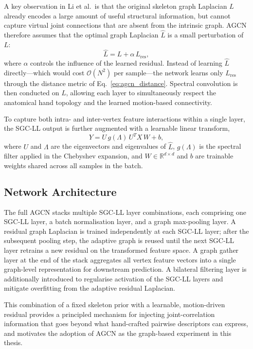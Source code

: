A key observation in Li et al.\ is that the original skeleton graph Laplacian $L$ already encodes a large amount of useful structural information, but cannot capture virtual joint connections that are absent from the intrinsic graph. AGCN therefore assumes that the optimal graph Laplacian $\hat{L}$ is a small perturbation of $L$:
\begin{equation}
    \hat{L} = L + \alpha\, L_{\mathrm{res}},
    \label{eq:agcn_laplacian}
\end{equation}
where $\alpha$ controls the influence of the learned residual. Instead of learning $\hat{L}$ directly---which would cost $\mathcal{O}(N^2)$ per sample---the network learns only $L_{\mathrm{res}}$ through the distance metric of Eq.~\ref{eq:agcn_distance}. Spectral convolution is then conducted on $\hat{L}$, allowing each layer to simultaneously respect the anatomical hand topology and the learned motion-based connectivity.

To capture both intra- and inter-vertex feature interactions within a single layer, the SGC-LL output is further augmented with a learnable linear transform,
\begin{equation}
    Y = U\, g(\Lambda)\, U^{T} X \, W + b,
\end{equation}
where $U$ and $\Lambda$ are the eigenvectors and eigenvalues of $\hat{L}$, $g(\Lambda)$ is the spectral filter applied in the Chebyshev expansion, and $W \in \mathbb{R}^{d \times d}$ and $b$ are trainable weights shared across all samples in the batch.

\subsection{Network Architecture}

The full AGCN stacks multiple SGC-LL layer combinations, each comprising one SGC-LL layer, a batch normalisation layer, and a graph max-pooling layer. A residual graph Laplacian is trained independently at each SGC-LL layer; after the subsequent pooling step, the adaptive graph is reused until the next SGC-LL layer retrains a new residual on the transformed feature space. A graph gather layer at the end of the stack aggregates all vertex feature vectors into a single graph-level representation for downstream prediction. A bilateral filtering layer is additionally introduced to regularise activation of the SGC-LL layers and mitigate overfitting from the adaptive residual Laplacian.

This combination of a fixed skeleton prior with a learnable, motion-driven residual provides a principled mechanism for injecting joint-correlation information that goes beyond what hand-crafted pairwise descriptors can express, and motivates the adoption of AGCN as the graph-based experiment in this thesis.
